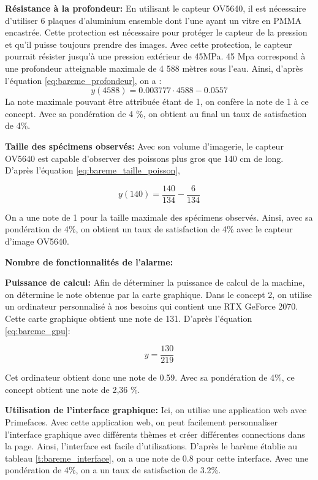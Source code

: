 \textbf{Résistance à la profondeur:}	
En utilisant le capteur OV5640, il est nécessaire d'utiliser 6 plaques d'aluminium ensemble dont l'une ayant un vitre en PMMA encastrée. Cette protection est nécessaire pour protéger le capteur de la pression et qu'il puisse toujours prendre des images. Avec cette protection, le capteur pourrait résister jusqu'à une pression extérieur de 45MPa. 45 Mpa correspond à une profondeur atteignable maximale de 4 588 mètres sous l'eau. Ainsi, d'après l'équation \ref{eq:bareme_profondeur}, on a :
\begin{equation}
    y(4588) = 0.003777\cdot4588-0.0557
\end{equation}
La note maximale pouvant être attribuée étant de 1, on confère la note de 1 à ce concept. Avec sa pondération de 4 \%, on obtient au final un taux de satisfaction de 4\%.
\vspace{5mm}


\textbf{Taille des spécimens observés:}
Avec son volume d'imagerie, le capteur OV5640 est capable d'observer des poissons plus gros que 140 cm de long. D'après l'équation \ref{eq:bareme_taille_poisson},

\begin{equation}
y(140) =  \frac{140}{134}- \frac{6}{134}
\end{equation}

On a une note de 1 pour la taille maximale des spécimens observés. Ainsi, avec sa pondération de 4\%, on obtient un taux de satisfaction de 4\% avec le capteur d'image OV5640.
\vspace{5mm}


\textbf{Nombre de fonctionnalités de l'alarme:}
\vspace{5mm}


\textbf{Puissance de calcul:} Afin de déterminer la puissance de calcul de la machine, on détermine le note obtenue par la carte graphique. Dans le concept 2, on utilise un ordinateur personnalisé à nos besoins qui contient une RTX GeForce 2070. Cette carte graphique obtient une note de 131. D'après l'équation \ref{eq:bareme_gpu}:

\begin{equation}
    y = \frac{130}{219}
\end{equation}

Cet ordinateur obtient donc une note de 0.59. Avec sa pondération de 4\%, ce concept obtient une note de 2,36 \%.
\vspace{5mm}


\textbf{Utilisation de l'interface graphique:}
Ici, on utilise une application web avec Primefaces. Avec cette application web, on peut facilement personnaliser l'interface graphique avec différents thèmes et créer différentes connections dans la page. Ainsi, l'interface est facile d'utilisations. D'après le barème établie au tableau \ref{t:bareme_interface}, on a une note de 0.8 pour cette interface. Avec une pondération de 4\%, on a un taux de satisfaction de 3.2\%.



